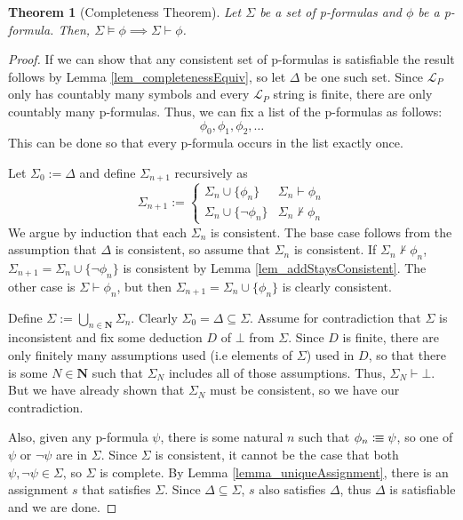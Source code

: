 \documentclass[leqno]{article}
\newtheorem{theorem}{Theorem}[section]
\newcommand{\N}{\mathbf{N}}
\newcommand{\set}[1]{\{#1\}}
\newcommand{\lang}{\mathcal{L}}
\newcommand{\proves}{\vdash}
\newcommand{\nproves}{\nvdash}
\newcommand{\is}{\colonequiv}
\begin{document}
\begin{theorem} [Completeness Theorem]
    Let $\Sigma$ be a set of p-formulas and $\phi$ be a p-formula. Then, $\Sigma \models \phi \implies \Sigma \proves \phi$.
\end{theorem}

\begin{proof}
   If we can show that any consistent set of p-formulas is satisfiable the result follows by Lemma \ref{lem_completenessEquiv}, so let $\Delta$ be one such set. Since $\lang_P$ only has countably many symbols and every $\lang_P$ string is finite, there are only countably many p-formulas. Thus, we can fix a list of the p-formulas as follows:
   \begin{equation*}
       \phi_0, \phi_1, \phi_2, \dots
   \end{equation*}
   This can be done so that every p-formula occurs in the list exactly once.
   
   Let $\Sigma_0 := \Delta$ and define $\Sigma_{n+1}$ recursively as
   \begin{equation*}
       \Sigma_{n+1} := \begin{cases}
       \Sigma_n \cup \set{\phi_n} & \Sigma_n \proves \phi_n \\
       \Sigma_n \cup \set{\neg \phi_n} & \Sigma_n \nproves \phi_n
       \end{cases}
   \end{equation*}
    We argue by induction that each $\Sigma_n$ is consistent. The base case follows from the assumption that $\Delta$ is consistent, so assume that $\Sigma_n$ is consistent. If $\Sigma_n \nproves \phi_n$, $\Sigma_{n+1} = \Sigma_n \cup \set{\neg \phi_n}$ is consistent by Lemma \ref{lem_addStaysConsistent}. The other case is $\Sigma \proves \phi_n$, but then $\Sigma_{n+1} = \Sigma_n \cup \set{\phi_n}$ is clearly consistent.
    
    Define $\Sigma := \bigcup_{n \in \N} \Sigma_n$. Clearly $\Sigma_0 = \Delta \subseteq \Sigma$. Assume for contradiction that $\Sigma$ is inconsistent and fix some deduction $D$ of $\bot$ from $\Sigma$. Since $D$ is finite, there are only finitely many assumptions used (i.e elements of $\Sigma$) used in $D$, so that there is some $N \in \N$ such that $\Sigma_N$ includes all of those assumptions. Thus, $\Sigma_N \proves \bot$. But we have already shown that $\Sigma_N$ must be consistent, so we have our contradiction.
   
   Also, given any p-formula $\psi$, there is some natural $n$ such that $\phi_n \is \psi$, so one of $\psi$ or $\neg \psi$ are in $\Sigma$. Since $\Sigma$ is consistent, it cannot be the case that both $\psi, \neg \psi \in \Sigma$, so $\Sigma$ is complete. By Lemma \ref{lemma_uniqueAssignment}, there is an assignment $s$ that satisfies $\Sigma$. Since $\Delta \subseteq \Sigma$, $s$ also satisfies $\Delta$, thus $\Delta$ is satisfiable and we are done.
   
\end{proof}
\end{document}

